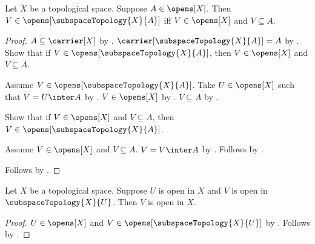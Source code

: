 \begin{theorem}\label{open_subspace_open_iff}
    Let $X$ be a topological space.
    Suppose $A\in\opens[X]$.
    Then $V\in\opens[\subspaceTopology{X}{A}]$ iff
        $V\in\opens[X]$ and $V\subseteq A$.
\end{theorem}
\begin{proof}
    $A\subseteq\carrier[X]$ by .
    $\carrier[\subspaceTopology{X}{A}]=A$ by
        .
    Show that if $V\in\opens[\subspaceTopology{X}{A}]$, then
        $V\in\opens[X]$ and $V\subseteq A$.
    \begin{subproof}
        Assume $V\in\opens[\subspaceTopology{X}{A}]$.
        Take $U\in\opens[X]$ such that $V=U\inter A$ by
            .
        $V\in\opens[X]$ by .
        $V\subseteq A$ by .
    \end{subproof}
    Show that if $V\in\opens[X]$ and $V\subseteq A$, then
        $V\in\opens[\subspaceTopology{X}{A}]$.
    \begin{subproof}
        Assume $V\in\opens[X]$ and $V\subseteq A$.
        $V=V\inter A$ by .
        Follows by .
    \end{subproof}
    Follows by \auto.
\end{proof}

\begin{classification}\label{open_in_open_subspace_is_open}
    Let $X$ be a topological space.
    Suppose $U$ is open in $X$ and $V$ is open in $\subspaceTopology{X}{U}$.
    Then $V$ is open in $X$.
\end{classification}
\begin{proof}
    $U\in\opens[X]$ and $V\in\opens[\subspaceTopology{X}{U}]$ by .
    Follows by .
\end{proof}

